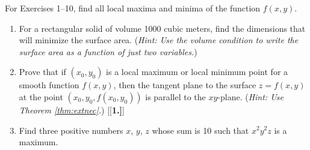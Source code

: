 \startexercises\label{sec2dot5}
\par\noindent For Exercises 1--10, find all local maxima and minima of the function $f(x,y)$.
\begin{enumerate}[\bfseries 1.]
[{[\bfseries 1.]}]
 \item For a rectangular solid of volume 1000 cubic meters, find the dimensions that will minimize the surface
 area. (\emph{Hint: Use the volume condition to write the surface area as a function of just two variables.})
 \item Prove that if $(x_0,y_0)$ is a local maximum or local minimum point for a smooth function
  $f(x,y)$, then the tangent plane to the surface $z=f(x,y)$ at the point $(x_0,y_0,f(x_0,y_0))$ is parallel to the $xy$-plane.
  (\emph{Hint: Use Theorem \ref{thm:extnec}.})
[{[\bfseries 1.]}]
 \item Find three positive numbers $x$, $y$, $z$ whose sum is 10 such that $x^2 y^2 z$ is a maximum.
\end{enumerate}
\newpage

